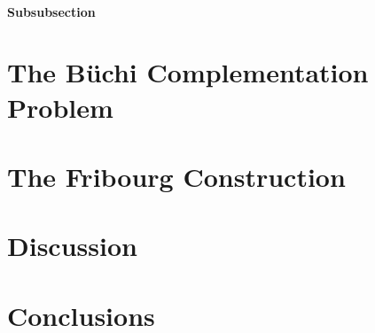 \documentclass{scrreprt}
\begin{document}
\subsubsection{Subsubsection} %

\chapter{The B\"uchi Complementation Problem}

\chapter{The Fribourg Construction}

\chapter{Discussion}

\chapter{Conclusions}
\end{document}

